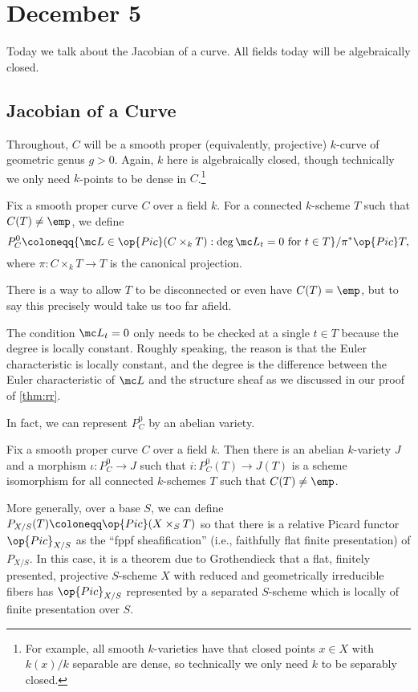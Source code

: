 \documentclass[../notes.tex]{subfiles}
\begin{document}
\section{December 5}

Today we talk about the Jacobian of a curve. All fields today will be algebraically closed.

\subsection{Jacobian of a Curve}
Throughout, $C$ will be a smooth proper (equivalently, projective) $k$-curve of geometric genus $g>0$. Again, $k$ here is algebraically closed, though technically we only need $k$-points to be dense in $C$.\footnote{For example, all smooth $k$-varieties have that closed points $x\in X$ with $k(x)/k$ separable are dense, so technically we only need $k$ to be separably closed.}
\begin{definition}
	Fix a smooth proper curve $C$ over a field $k$. For a connected $k$-scheme $T$ such that $C(T)\ne\emp$, we define
	\[P^0_C\coloneqq\{\mc L\in\op{Pic}(C\times_kT):\deg\mc L_t=0\text{ for }t\in T\}/\pi^*\op{Pic}T,\]
	where $\pi\colon C\times_kT\to T$ is the canonical projection.
\end{definition}
\begin{remark}
	There is a way to allow $T$ to be disconnected or even have $C(T)=\emp$, but to say this precisely would take us too far afield.
\end{remark}
\begin{remark}
	The condition $\mc L_t=0$ only needs to be checked at a single $t\in T$ because the degree is locally constant. Roughly speaking, the reason is that the Euler characteristic is locally constant, and the degree is the difference between the Euler characteristic of $\mc L$ and the structure sheaf as we discussed in our proof of \autoref{thm:rr}.
\end{remark}
In fact, we can represent $P^0_C$ by an abelian variety.
\begin{theorem} \label{thm:get-jac}
	Fix a smooth proper curve $C$ over a field $k$. Then there is an abelian $k$-variety $J$ and a morphism $\iota\colon P^0_C\to J$ such that $i\colon P^0_C(T)\to J(T)$ is a scheme isomorphism for all connected $k$-schemes $T$ such that $C(T)\ne\emp$.
\end{theorem}
\begin{remark}
	More generally, over a base $S$, we can define $P_{X/S}(T)\coloneqq\op{Pic}(X\times_ST)$ so that there is a relative Picard functor $\op{Pic}_{X/S}$ as the ``fppf sheafification'' (i.e., faithfully flat finite presentation) of $P_{X/S}$. In this case, it is a theorem due to Grothendieck that a flat, finitely presented, projective $S$-scheme $X$ with reduced and geometrically irreducible fibers has $\op{Pic}_{X/S}$ represented by a separated $S$-scheme which is locally of finite presentation over $S$.
\end{remark}
\end{document}
